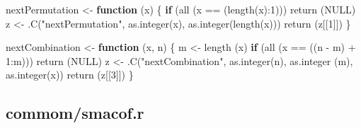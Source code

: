 \documentclass[
  12pt,
]{book}
\newenvironment{Shaded}{\begin{snugshade}}{\end{snugshade}}
\newcommand{\ConstantTok}[1]{\textcolor[rgb]{0.00,0.00,0.00}{#1}}
\newcommand{\ControlFlowTok}[1]{\textcolor[rgb]{0.13,0.29,0.53}{\textbf{#1}}}
\newcommand{\DecValTok}[1]{\textcolor[rgb]{0.00,0.00,0.81}{#1}}
\newcommand{\FunctionTok}[1]{\textcolor[rgb]{0.00,0.00,0.00}{#1}}
\newcommand{\NormalTok}[1]{#1}
\newcommand{\OtherTok}[1]{\textcolor[rgb]{0.56,0.35,0.01}{#1}}
\newcommand{\SpecialCharTok}[1]{\textcolor[rgb]{0.00,0.00,0.00}{#1}}
\newcommand{\StringTok}[1]{\textcolor[rgb]{0.31,0.60,0.02}{#1}}
\theoremstyle{definition}
\theoremstyle{definition}
\theoremstyle{definition}
\theoremstyle{definition}
\theoremstyle{remark}
\begin{document}
\begin{Shaded}
\begin{Highlighting}[]
\NormalTok{nextPermutation }\OtherTok{\textless{}{-}} \ControlFlowTok{function}\NormalTok{ (x) \{}
  \ControlFlowTok{if}\NormalTok{ (}\FunctionTok{all}\NormalTok{ (x }\SpecialCharTok{==}\NormalTok{ (}\FunctionTok{length}\NormalTok{(x)}\SpecialCharTok{:}\DecValTok{1}\NormalTok{)))}
    \FunctionTok{return}\NormalTok{ (}\ConstantTok{NULL}\NormalTok{)}
\NormalTok{  z }\OtherTok{\textless{}{-}} \FunctionTok{.C}\NormalTok{(}\StringTok{"nextPermutation"}\NormalTok{, }\FunctionTok{as.integer}\NormalTok{(x), }\FunctionTok{as.integer}\NormalTok{(}\FunctionTok{length}\NormalTok{(x)))}
  \FunctionTok{return}\NormalTok{ (z[[}\DecValTok{1}\NormalTok{]])}
\NormalTok{\}}

\NormalTok{nextCombination }\OtherTok{\textless{}{-}} \ControlFlowTok{function}\NormalTok{ (x, n) \{}
\NormalTok{  m }\OtherTok{\textless{}{-}} \FunctionTok{length}\NormalTok{ (x)}
  \ControlFlowTok{if}\NormalTok{ (}\FunctionTok{all}\NormalTok{ (x }\SpecialCharTok{==}\NormalTok{ ((n }\SpecialCharTok{{-}}\NormalTok{ m) }\SpecialCharTok{+} \DecValTok{1}\SpecialCharTok{:}\NormalTok{m)))}
    \FunctionTok{return}\NormalTok{ (}\ConstantTok{NULL}\NormalTok{)}
\NormalTok{  z }\OtherTok{\textless{}{-}}
    \FunctionTok{.C}\NormalTok{(}\StringTok{"nextCombination"}\NormalTok{,}
       \FunctionTok{as.integer}\NormalTok{(n),}
       \FunctionTok{as.integer}\NormalTok{ (m),}
       \FunctionTok{as.integer}\NormalTok{(x))}
  \FunctionTok{return}\NormalTok{ (z[[}\DecValTok{3}\NormalTok{]])}
\NormalTok{\}}
\end{Highlighting}
\end{Shaded}

\hypertarget{apsmacofcode}{%
\subsection{commom/smacof.r}\label{apsmacofcode}}
\end{document}
